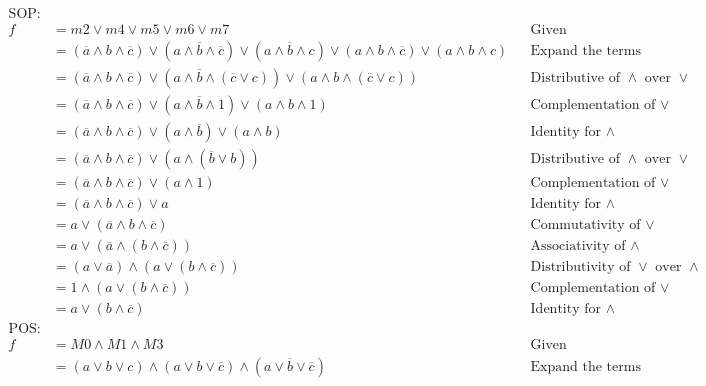 \documentclass[10pt]{article}
\begin{document}
\begin{align}
\text{SOP:}\\
f &= m2 \lor m4 \lor m5 \lor m6 \lor m7 			&& \text{Given} \\
&= ( \overline{a} \land b \land \overline{c} ) \lor 
	( a \land \overline{b} \land \overline{c} ) \lor
	( a \land \overline{b} \land c ) \lor
	( a \land b \land \overline{c} ) \lor
	( a \land b \land c ) 							&& \text{Expand the terms} \\
&= ( \overline{a} \land b \land \overline{c} ) \lor
	( a \land \overline{b} \land (\overline{c} \lor c) ) \lor
	( a \land b \land (\overline{c} \lor c) )		&& \text{Distributive of $\land$ over $\lor$} \\
&= ( \overline{a} \land b \land \overline{c} ) \lor
	( a \land \overline{b} \land 1 ) \lor
	( a \land b \land 1 )							&& \text{Complementation of $\lor$} \\
&= ( \overline{a} \land b \land \overline{c} ) \lor
	( a \land \overline{b} ) \lor
	( a \land b )									&& \text{Identity for $\land$} \\
&= ( \overline{a} \land b \land \overline{c} ) \lor
	( a \land (\overline{b} \lor b) )				&& \text{Distributive of $\land$ over $\lor$} \\
&= ( \overline{a} \land b \land \overline{c} ) \lor
	( a \land 1 )									&& \text{Complementation of $\lor$} \\
&= ( \overline{a} \land b \land \overline{c} ) \lor
	a												&& \text{Identity for $\land$} \\
&= a \lor
	( \overline{a} \land b \land \overline{c} ) 	&& \text{Commutativity of $\lor$} \\
&= a \lor
	( \overline{a} \land ( b \land \overline{c} )) 	&& \text{Associativity of $\land$} \\
&= (a \lor \overline{a}) \land
	(a \lor (b \land \overline{c}) )				&& \text{Distributivity of $\lor$ over $\land$}\\
&= 1 \land (a \lor (b \land \overline{c}) )			&& \text{Complementation of $\lor$} \\
&= a \lor (b \land \overline{c}) 					&& \text{Identity for $\land$} \\
%
%
\text{POS:}\\
f &= M0 \land M1 \land M3 							&& \text{Given} \\
&= (a \lor b \lor c) \land							
	(a \lor b \lor \overline{c}) \land
	(a \lor \overline{b} \lor \overline{c})			&& \text{Expand the terms} \\

\end{align}
\end{document}
